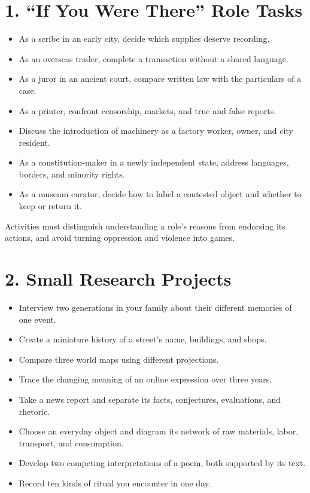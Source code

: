 \section*{1. ``If You Were There'' Role Tasks}
\begin{itemize}
\item As a scribe in an early city, decide which supplies deserve recording.
\item As an overseas trader, complete a transaction without a shared language.
\item As a juror in an ancient court, compare written law with the particulars of a case.
\item As a printer, confront censorship, markets, and true and false reports.
\item Discuss the introduction of machinery as a factory worker, owner, and city resident.
\item As a constitution-maker in a newly independent state, address languages, borders, and minority rights.
\item As a museum curator, decide how to label a contested object and whether to keep or return it.
\end{itemize}
Activities must distinguish understanding a role's reasons from endorsing its actions, and avoid turning oppression and violence into games.

\section*{2. Small Research Projects}
\begin{itemize}
\item Interview two generations in your family about their different memories of one event.
\item Create a miniature history of a street's name, buildings, and shops.
\item Compare three world maps using different projections.
\item Trace the changing meaning of an online expression over three years.
\item Take a news report and separate its facts, conjectures, evaluations, and rhetoric.
\item Choose an everyday object and diagram its network of raw materials, labor, transport, and consumption.
\item Develop two competing interpretations of a poem, both supported by its text.
\item Record ten kinds of ritual you encounter in one day.
\end{itemize}
